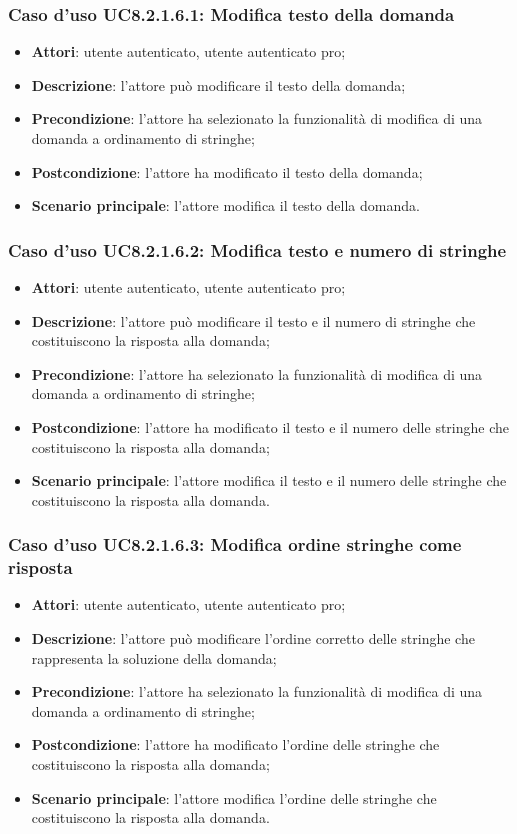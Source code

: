 \subsubsection{Caso d'uso UC8.2.1.6.1: Modifica testo della domanda}
\begin{itemize}
	\item \textbf{Attori}: utente autenticato, utente autenticato pro;
	\item \textbf{Descrizione}: l'attore può modificare il testo della domanda;
	\item \textbf{Precondizione}: l'attore ha selezionato la funzionalità di modifica di una domanda a ordinamento di stringhe;
	\item \textbf{Postcondizione}: l'attore ha modificato il testo della domanda;
	\item \textbf{Scenario principale}: l'attore modifica il testo della domanda.
\end{itemize}

\subsubsection{Caso d'uso UC8.2.1.6.2: Modifica testo e numero di stringhe}
\begin{itemize}
	\item \textbf{Attori}: utente autenticato, utente autenticato pro;
	\item \textbf{Descrizione}: l'attore può modificare il testo e il numero di stringhe che costituiscono la risposta alla domanda;
	\item \textbf{Precondizione}: l'attore ha selezionato la funzionalità di modifica di una domanda a ordinamento di stringhe;
	\item \textbf{Postcondizione}: l'attore ha modificato il testo e il numero delle stringhe che costituiscono la risposta alla domanda;
	\item \textbf{Scenario principale}: l'attore modifica il testo e il numero delle stringhe che costituiscono la risposta alla domanda.
\end{itemize}

\subsubsection{Caso d'uso UC8.2.1.6.3: Modifica ordine stringhe come risposta}
\begin{itemize}
	\item \textbf{Attori}: utente autenticato, utente autenticato pro;
	\item \textbf{Descrizione}: l'attore può modificare l'ordine corretto delle stringhe che rappresenta la soluzione della domanda;
	\item \textbf{Precondizione}: l'attore ha selezionato la funzionalità di modifica di una domanda a ordinamento di stringhe;
	\item \textbf{Postcondizione}: l'attore ha modificato l'ordine delle stringhe che costituiscono la risposta alla domanda;
	\item \textbf{Scenario principale}: l'attore modifica l'ordine delle stringhe che costituiscono la risposta alla domanda.
\end{itemize}
